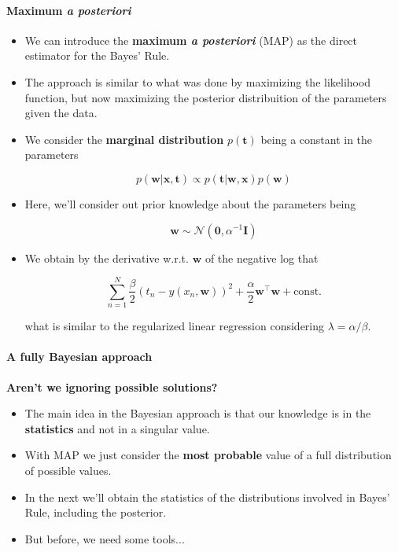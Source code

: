 \begin{frame}{\insertsection}
	\framesubtitle{Maximum \textit{a posteriori}}
	\begin{itemize}
		\item We can introduce the \textcolor{UniOrange}{\textbf{maximum \textit{a posteriori}}} (MAP) as the direct estimator for the Bayes' Rule.
		\item The approach is similar to what was done by maximizing the likelihood function, but now maximizing the posterior distribuition of the parameters given the data.
		\item We consider the \textcolor{UniOrange}{\textbf{marginal distribution}} $p(\mathbf{t})$ being a constant in the parameters
	
		\begin{equation*}
			p\left( \mathbf{w} | \mathbf{x}, \mathbf{t} \right) \propto p\left(  \mathbf{t} |\mathbf{w} ,\mathbf{x} \right)p\left( \mathbf{w} \right)
		\end{equation*}

		\item Here, we'll consider out prior knowledge about the parameters being
		
		\begin{equation*}
			\mathbf{w} \sim \mathcal{N} \left( \mathbf{0}, \alpha^{-1} \mathbf{I} \right)
		\end{equation*}

		\item We obtain by the derivative w.r.t. $\mathbf{w}$ of the negative log that
		
		\begin{equation*}
			\sum_{n=1}^N \frac{\beta}{2} (t_n -  y(x_n, \mathbf{w}))^2 + \frac{\alpha}{2} \mathbf{w}^{\top}\mathbf{w} + \text{const.}
		\end{equation*}

		what is similar to the regularized linear regression considering $\lambda = \alpha/\beta$.
	\end{itemize}
\end{frame}

\begin{frame}{\insertsection}
	\framesubtitle{A fully Bayesian approach}

	\textcolor{UniGold}{\textbf{Aren't we ignoring possible solutions?}}
	\begin{itemize}
		\item The main idea in the Bayesian approach is that our knowledge is in the \textcolor{UniOrange}{\textbf{statistics}} and not in a singular value.
		\item With MAP we just consider the \textcolor{UniOrange}{\textbf{most probable}} value of a full distribution of possible values.
		\item In the next we'll obtain the statistics of the distributions involved in Bayes' Rule, including the posterior.
		\item But before, we need some tools...
	\end{itemize}
\end{frame}


